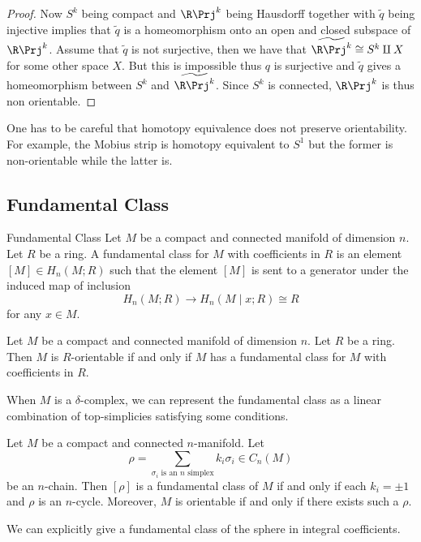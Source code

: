 \documentclass[a4paper]{article}
\begin{document}
\begin{prp}{}{}
\begin{proof}
Now $S^k$ being compact and $\R\Prj^k$ being Hausdorff together with $\widetilde{q}$ being injective implies that $\widetilde{q}$ is a homeomorphism onto an open and closed subspace of $\R\Prj^k$. Assume that $\widetilde{q}$ is not surjective, then we have that $\widetilde{\R\Prj^k}\cong S^k\amalg X$ for some other space $X$. But this is impossible thus $q$ is surjective and $\widetilde{q}$ gives a homeomorphism between $S^k$ and $\widetilde{\R\Prj^k}$. Since $S^k$ is connected, $\R\Prj^k$ is thus non orientable. 
\end{proof}
\end{prp}

One has to be careful that homotopy equivalence does not preserve orientability. For example, the Mobius strip is homotopy equivalent to $S^1$ but the former is non-orientable while the latter is. 

\subsection{Fundamental Class}
\begin{defn}{Fundamental Class}{} Let $M$ be a compact and connected manifold of dimension $n$. Let $R$ be a ring. A fundamental class for $M$ with coefficients in $R$ is an element $[M]\in H_n(M;R)$ such that the element $[M]$ is sent to a generator under the induced map of inclusion $$H_n(M;R)\to H_n(M\;|\;x;R)\cong R$$ for any $x\in M$. 
\end{defn}

\begin{lmm}{}{} Let $M$ be a compact and connected manifold of dimension $n$. Let $R$ be a ring. Then $M$ is $R$-orientable if and only if $M$ has a fundamental class for $M$ with coefficients in $R$. 
\end{lmm}

When $M$ is a $\delta$-complex, we can represent the fundamental class as a linear combination of top-simplicies satisfying some conditions. 

\begin{prp}{}{} Let $M$ be a compact and connected $n$-manifold. Let $$\rho=\sum_{\sigma_i\text{ is an }n\text{ simplex}}k_i\sigma_i\in C_n(M)$$ be an $n$-chain. Then $[\rho]$ is a fundamental class of $M$ if and only if each $k_i=\pm 1$ and $\rho$ is an $n$-cycle. Moreover, $M$ is orientable if and only if there exists such a $\rho$. 
\end{prp}

We can explicitly give a fundamental class of the sphere in integral coefficients. 
\end{document}
